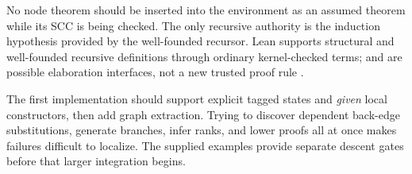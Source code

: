No node theorem should be inserted into the environment as an assumed theorem
while its SCC is being checked. The only recursive authority is the induction
hypothesis provided by the well-founded recursor. Lean supports structural and
well-founded recursive definitions through ordinary kernel-checked terms;
 and  are possible elaboration
interfaces, not a new trusted proof rule \cite{lean-recursion,lean-inductive}.

The first implementation should support explicit tagged states and \emph{given}
local constructors, then add graph extraction. Trying to discover dependent
back-edge substitutions, generate branches, infer ranks, and lower proofs all
at once makes failures difficult to localize. The supplied examples provide
separate descent gates before that larger integration begins.
